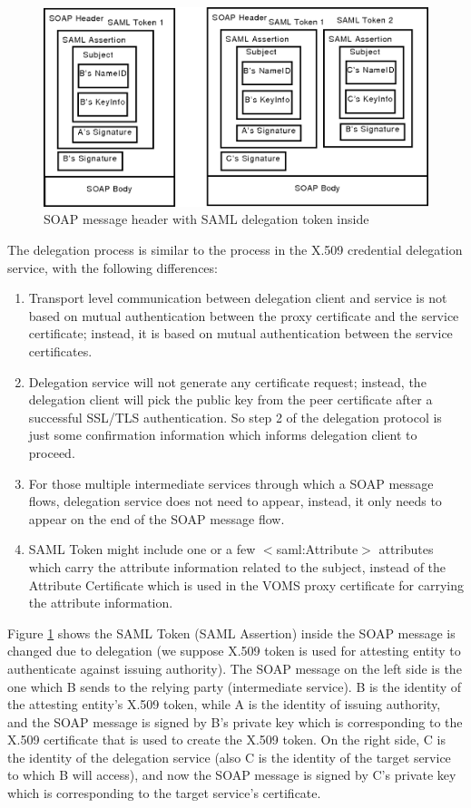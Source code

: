 \documentclass[twocolumn]{svjour3}         %
\begin{document}
\begin{figure}
\includegraphics[width=0.9\columnwidth]{SAMLDelegationMessage.png}
\caption{SOAP message header with SAML delegation token inside}
\label{fig:SAMLDelegationMessage}
\end{figure}
The delegation process is similar to the process in the X.509 credential delegation service, with the following differences:
\begin{enumerate}
	\item Transport level communication between delegation client and service is not based on mutual authentication between the proxy certificate and the service certificate; instead, it is based on mutual authentication between the service certificates.
	\item Delegation service will not generate any certificate request; instead, the delegation client will pick the public key from the peer certificate after a successful SSL/TLS authentication. So step 2 of the delegation protocol is just some confirmation information which informs delegation client to proceed.
	\item For those multiple intermediate services through which a SOAP message flows, delegation service does not need to appear, instead, it only needs to appear on the end of the SOAP message flow.
	\item SAML Token might include one or a few $<$saml:Attribute$>$ attributes which carry the attribute information related to the subject, instead of the Attribute Certificate which is used in the VOMS proxy certificate for carrying the attribute information.
\end{enumerate}
Figure \ref{fig:SAMLDelegationMessage} shows the SAML Token (SAML Assertion) inside the SOAP message is changed due to delegation (we suppose X.509 token is used for attesting entity to authenticate against issuing authority). The SOAP message on the left side is the one which B sends to the relying party (intermediate service). B is the identity of the attesting entity's X.509 token, while A is the identity of issuing authority, and the SOAP message is signed by B's private key which is corresponding to the X.509 certificate that is used to create the X.509 token. On the right side, C is the identity of the delegation service (also C is the identity of the target service to which B will access), and now the SOAP message is signed by C's private key which is corresponding to the target service's certificate.
\end{document}
